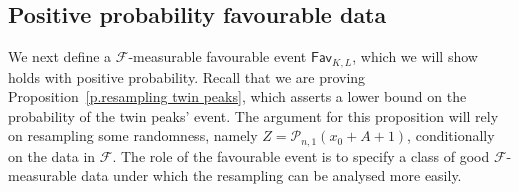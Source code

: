 \documentclass[oneside,final,11pt]{amsart}
\theoremstyle{definition}
\newcommand{\Lsc}{\CP_n}
\newcommand{\fav}{\mathsf{Fav}}
\renewcommand{\L}{\CP}
\newcommand{\fh}{\mathfrak{h}}
\newcommand{\h}{\fh^{{\scriptscriptstyle(}n{\scriptscriptstyle)}}}
\newcommand{\hz}[1]{\fh^{{\scriptscriptstyle(}n{\scriptscriptstyle)},#1}}
\newcommand{\1}[1]{\mathbf{1}_{#1}}
\newcommand{\F}{\mathscr{F}}
\newcommand{\CP}{\mathcal{P}}
\numberwithin{equation}{section}
\begin{document}





\subsection{Positive probability favourable data} \label{s.favourable data}

We next define a $\F$-measurable favourable event $\fav_{K, L}$, which we will show holds with positive probability. Recall that we are proving Proposition~\ref{p.resampling twin peaks}, which asserts a lower bound on the probability of the twin peaks' event. The argument for this proposition will rely on resampling some randomness, namely $Z = \L_{n,1}(x_0+A+1)$, conditionally on the data in $\F$. The role of the favourable event is to specify a class of good $\F$-measurable data under which the resampling can be analysed more easily.
\end{document}
